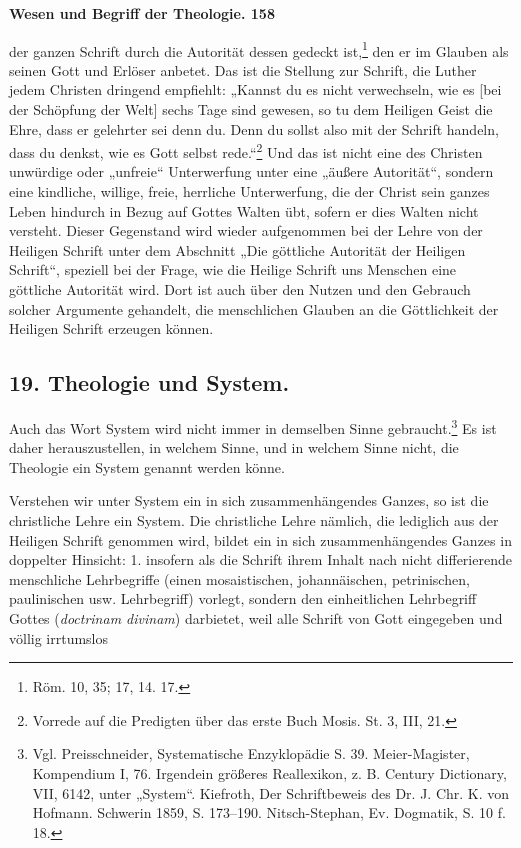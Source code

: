 \textbf{Wesen und Begriff der Theologie. 158}

der ganzen Schrift durch die Autorität dessen gedeckt ist,\footnote{Röm. 10, 35; 17, 14. 17.} den er im Glauben als seinen Gott und Erlöser anbetet. Das ist die Stellung zur Schrift, die Luther jedem Christen dringend empfiehlt: „Kannst du es nicht verwechseln, wie es [bei der Schöpfung der Welt] sechs Tage sind gewesen, so tu dem Heiligen Geist die Ehre, dass er gelehrter sei denn du. Denn du sollst also mit der Schrift handeln, dass du denkst, wie es Gott selbst rede.“\footnote{Vorrede auf die Predigten über das erste Buch Mosis. St. 3, III, 21.} Und das ist nicht eine des Christen unwürdige oder „unfreie“ Unterwerfung unter eine „äußere Autorität“, sondern eine kindliche, willige, freie, herrliche Unterwerfung, die der Christ sein ganzes Leben hindurch in Bezug auf Gottes Walten übt, sofern er dies Walten nicht versteht. Dieser Gegenstand wird wieder aufgenommen bei der Lehre von der Heiligen Schrift unter dem Abschnitt „Die göttliche Autorität der Heiligen Schrift“, speziell bei der Frage, wie die Heilige Schrift uns Menschen eine göttliche Autorität wird. Dort ist auch über den Nutzen und den Gebrauch solcher Argumente gehandelt, die menschlichen Glauben an die Göttlichkeit der Heiligen Schrift erzeugen können.

\subsection*{19. Theologie und System.}

Auch das Wort System wird nicht immer in demselben Sinne gebraucht.\footnote{Vgl. Preisschneider, Systematische Enzyklopädie S. 39. Meier-Magister, Kompendium I, 76. Irgendein größeres Reallexikon, z. B. Century Dictionary, VII, 6142, unter „System“. Kiefroth, Der Schriftbeweis des Dr. J. Chr. K. von Hofmann. Schwerin 1859, S. 173--190. Nitsch-Stephan, Ev. Dogmatik, S. 10 f. 18.} Es ist daher herauszustellen, in welchem Sinne, und in welchem Sinne nicht, die Theologie ein System genannt werden könne.

Verstehen wir unter System ein in sich zusammenhängendes Ganzes, so ist die christliche Lehre ein System. Die christliche Lehre nämlich, die lediglich aus der Heiligen Schrift genommen wird, bildet ein in sich zusammenhängendes Ganzes in doppelter Hinsicht: 1. insofern als die Schrift ihrem Inhalt nach nicht differierende menschliche Lehrbegriffe (einen mosaistischen, johannäischen, petrinischen, paulinischen usw. Lehrbegriff) vorlegt, sondern den einheitlichen Lehrbegriff Gottes (\textit{doctrinam divinam}) darbietet, weil alle Schrift von Gott eingegeben und völlig irrtumslos